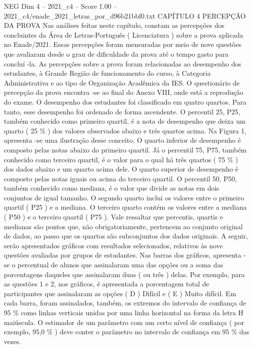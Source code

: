 \begin{textsample}{NEG Dim 4 – 2021\_c4 – Score 1.00 – 2021\_c4/enade\_2021\_letras\_por\_d96b21bbf0.txt}  \label{ex:f4_neg_227}
CAPÍTULO 4 PERCEPÇÃO DA PROVA Nas análises feitas neste capítulo, constam as percepções dos concluintes da Área de Letras-Português ( Licenciatura ) sobre a prova aplicada no Enade/2021.
Essas percepções foram mensuradas por meio de nove questões que avaliaram desde o grau de dificuldade da prova até o tempo gasto para concluí -la.
As percepções sobre a prova foram relacionadas ao desempenho dos estudantes, à Grande Região de funcionamento do curso, à Categoria Administrativa e ao tipo de Organização Acadêmica da IES.
O questionário de percepção da prova encontra -se ao final do Anexo VIII, onde está a reprodução do exame.
O desempenho dos estudantes foi classificado em quatro quartos.
Para tanto, esse desempenho foi ordenado de forma ascendente.
O percentil 25, P25, também conhecido como primeiro quartil, é a nota de desempenho que deixa um quarto ( 25 \% ) dos valores observados abaixo e três quartos acima.
Na Figura 1, apresenta -se uma ilustração desse conceito.
O quarto inferior de desempenho é composto pelas notas abaixo do primeiro quartil.
Já o percentil 75, P75, também conhecido como terceiro quartil, é o valor para o qual há três quartos ( 75 \% ) dos dados abaixo e um quarto acima dele.
O quarto superior de desempenho é composto pelas notas iguais ou acima do terceiro quartil.
O percentil 50, P50, também conhecido como mediana, é o valor que divide as notas em dois conjuntos de igual tamanho.
O segundo quarto inclui os valores entre o primeiro quartil ( P25 ) e a mediana.
O terceiro quarto contém os valores entre a mediana ( P50 ) e o terceiro quartil ( P75 ).
Vale ressaltar que percentis, quartis e medianas são pontos que, não obrigatoriamente, pertencem ao conjunto original de dados, ao passo que os quartos são subconjuntos dos dados originais.
A seguir, serão apresentados gráficos com resultados selecionados, relativos às nove questões avaliadas por grupos de estudantes.
Nas barras dos gráficos, apresenta -se o percentual de alunos que assinalaram uma das opções ou a soma das porcentagens daqueles que assinalaram duas ( ou três ) delas.
Por exemplo, para as questões 1 e 2, nos gráficos, é apresentada a porcentagem total de participantes que assinalaram as opções ( D ) Difícil e ( E ) Muito difícil.
Em cada barra, foram assinalados, também, os extremos do intervalo de confiança de 95 \% como linhas verticais unidas por uma linha horizontal na forma da letra H maiúscula.
O estimador de um parâmetro com um certo nível de confiança ( por exemplo, 95,0 \% ) deve conter o parâmetro no intervalo de confiança em 95 \% das vezes.

\end{textsample}
